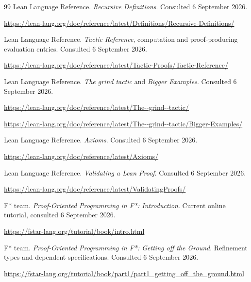 \documentclass[11pt,letterpaper]{article}
\theoremstyle{remark}
\begin{document}
\begin{thebibliography}{99}
Lean Language Reference. \emph{Recursive Definitions}. Consulted
6 September 2026.\par
\url{https://lean-lang.org/doc/reference/latest/Definitions/Recursive-Definitions/}

Lean Language Reference. \emph{Tactic Reference}, computation and proof-producing
evaluation entries. Consulted 6 September 2026.\par
\url{https://lean-lang.org/doc/reference/latest/Tactic-Proofs/Tactic-Reference/}

Lean Language Reference. \emph{The grind tactic} and \emph{Bigger Examples}.
Consulted 6 September 2026.\par
\url{https://lean-lang.org/doc/reference/latest/The--grind--tactic/}\par
\url{https://lean-lang.org/doc/reference/latest/The--grind--tactic/Bigger-Examples/}

Lean Language Reference. \emph{Axioms}. Consulted 6 September 2026.\par
\url{https://lean-lang.org/doc/reference/latest/Axioms/}

Lean Language Reference. \emph{Validating a Lean Proof}. Consulted
6 September 2026.\par
\url{https://lean-lang.org/doc/reference/latest/ValidatingProofs/}

F* team. \emph{Proof-Oriented Programming in F*: Introduction}.
Current online tutorial, consulted 6 September 2026.\par
\url{https://fstar-lang.org/tutorial/book/intro.html}

F* team. \emph{Proof-Oriented Programming in F*: Getting off the Ground}.
Refinement types and dependent specifications. Consulted 6 September 2026.\par
\url{https://fstar-lang.org/tutorial/book/part1/part1_getting_off_the_ground.html}

\end{thebibliography}
\end{document}
